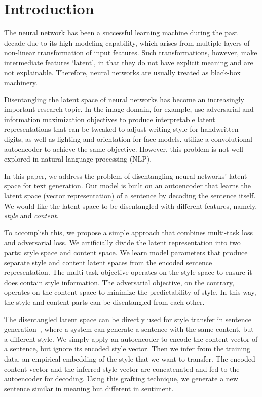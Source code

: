 \documentclass[11pt,a4paper]{article}
\begin{document}
\section{Introduction}

The neural network has been a successful learning machine during the past decade due to its high modeling capability, which arises from multiple layers of non-linear transformation of input features. Such transformations, however, make intermediate features `latent', in that they do not have explicit meaning and are not explainable. Therefore, neural networks are usually treated as black-box machinery.

Disentangling the latent space of neural networks has become an increasingly important research topic. In the image domain, for example,  use adversarial and information maximization objectives to produce interpretable latent representations that can be tweaked to adjust writing style for handwritten digits, as well as lighting and orientation for face models.  utilize a convolutional autoencoder to achieve the same objective. However, this problem is not well explored in natural language processing (NLP).

In this paper, we address the problem of disentangling neural networks' latent space for text generation. Our model is built on an autoencoder that learns the latent space (vector representation) of a sentence by decoding the sentence itself. We would like the latent space to be disentangled with different features, namely, \textit{style} and \textit{content}.

To accomplish this, we propose a simple approach that combines multi-task loss and adversarial loss. We artificially divide the latent representation into two parts: style space and content space.
We learn model parameters that produce separate style and content latent spaces from the encoded sentence representation. The multi-task objective operates on the style space to ensure it does contain style information.
The adversarial objective, on the contrary, operates on the content space to minimize the predictability of style. In this way, the style and content parts can be disentangled from each other.

The disentangled latent space can be directly used for style transfer in sentence generation~\cite{fu2017style,shen2017style}, where a system can generate a sentence with the same content, but a different style. We simply apply an autoencoder to encode the content vector of a sentence, but ignore its encoded style vector. Then we infer from the training data, an empirical embedding of the style that we want to transfer. The encoded content vector and the inferred style vector are concatenated and fed to the autoencoder for decoding. Using this grafting technique, we generate a new sentence similar in meaning but different in sentiment.
\end{document}
